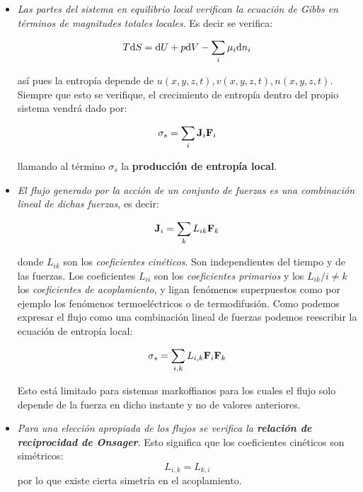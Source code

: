 \documentclass[12pt]{book}
\begin{document}
\begin{itemize}
\item \textit{Las partes del sistema en equilibrio local verifican la ecuación de Gibbs en términos de magnitudes totales locales}. Es decir se verifica:

\begin{equation}
T \mathrm{d} S = \mathrm{d} U + p \mathrm{d} V - \sum_i \mu_i \mathrm{d} n_i \label{ec:5.2-001}
\end{equation}

así pues la entropía depende de $u(x,y,z,t), v(x,y,z,t), n(x,y,z,t)$. Siempre que esto se verifique, el crecimiento de entropía dentro del propio sistema vendrá dado por:

\begin{equation}
\sigma_s = \sum_i \textbf{J}_i \textbf{F}_i
\end{equation}

llamando al término $\sigma_s$ la \textbf{producción de entropía local}.


\item \textit{El flujo generado por la acción de un conjunto de fuerzas es una combinación lineal de dichas fuerzas}, es decir:

\begin{equation}
\textbf{J}_i = \sum_{k} L_{ik} \textbf{F}_{k}
\end{equation}

donde $L_{ik}$ son los \textit{coeficientes cinéticos}. Son independientes del tiempo y de las fuerzas. Los coeficientes $L_{ii}$ son los \textit{coeficientes primarios} y los $L_{ik} / i \neq k$ los \textit{coeficientes de acoplamiento}, y ligan fenómenos superpuestos como por ejemplo los fenómenos termoeléctricos o de termodifusión. Como podemos expresar el flujo como una combinación lineal de fuerzas podemos reescribir la ecuación de entropía local:

\begin{equation}
\sigma_s  = \sum_{i,k} L_{i,k} \textbf{F}_i \textbf{F}_k
\end{equation}

Esto está limitado para sistemas markoffianos para los cuales el flujo solo depende de la fuerza en dicho instante y no de valores anteriores.

\item \textit{Para una elección apropiada de los flujos se verifica la \textbf{relación de reciprocidad de Onsager}}. Esto significa que los coeficientes cinéticos son simétricos: 
\begin{equation}
L_{i,k} = L_{k,i}
\end{equation}
por lo que existe cierta simetría en el acoplamiento. 
\end{itemize}
 
\end{document}
